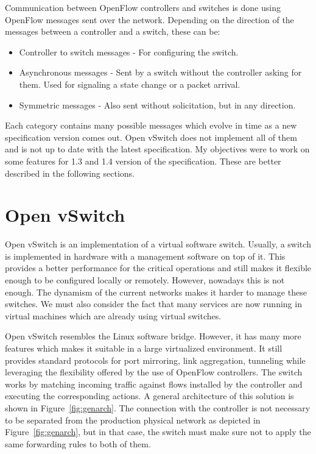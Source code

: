 Communication between OpenFlow controllers and switches is done using OpenFlow messages sent over the network.
Depending on the direction of the messages between a controller and a switch, these can be:
\begin{itemize}
 \item Controller to switch messages - For configuring the switch.
 \item Asynchronous messages - Sent by a switch without the controller asking for them. Used
 for signaling a state change or a packet arrival.
 \item Symmetric messages - Also sent without solicitation, but in any direction.
\end{itemize}

Each category contains many possible messages which evolve in time as a new specification version comes out.
Open vSwitch does not implement all of them and is not up to date with the latest specification. My objectives
were to work on some features for 1.3 and 1.4 version of the specification. These are better described in the following sections.


\section{Open vSwitch}
Open vSwitch\cite{ovs} is an implementation of a virtual software switch. Usually, a switch is implemented in hardware
with a management software on top of it. This provides a better performance for the critical operations
and still makes it flexible enough to be configured locally or remotely. However, nowadays this is not
enough. The dynamism of the current networks makes it harder to manage these switches. We must also
consider the fact that many services are now running in virtual machines which are already using
virtual switches.

Open vSwitch resembles the Linux software bridge. However, it has many more features which makes it
suitable in a large virtualized environment. It still provides standard protocols for port mirroring,
link aggregation, tunneling while leveraging the flexibility offered by the use of OpenFlow controllers.
The switch works by matching incoming traffic against flows installed by the controller and executing
the corresponding actions. A general architecture of this solution is shown in Figure~\ref{fig:genarch}.
The connection with the controller is not necessary to be separated from the production physical network
as depicted in Figure~\ref{fig:genarch}, but in that case, the switch must make sure not to apply the
same forwarding rules to both of them.

